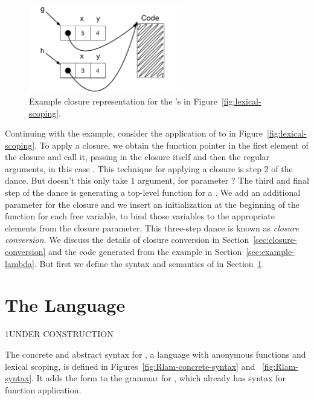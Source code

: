 \documentclass[7x10]{TimesAPriori_MIT}%
\def\pythonEd{1}
\def\edition{1}
\newcommand{\python}[1]{{\if\edition\pythonEd #1\fi}}
\begin{document}
\begin{figure}[tbp]
\centering \includegraphics[width=0.6\textwidth]{figs/closures}
\caption{Example closure representation for the 's
  in Figure~\ref{fig:lexical-scoping}.}
\label{fig:closures}
\end{figure}

Continuing with the example, consider the application of  to
 in Figure~\ref{fig:lexical-scoping}.  To apply a closure, we
obtain the function pointer in the first element of the closure and
call it, passing in the closure itself and then the regular arguments,
in this case . This technique for applying a closure is step
2 of the dance.
%
But doesn't this  only take 1 argument, for parameter
? The third and final step of the dance is generating a
top-level function for a .  We add an additional
parameter for the closure and we insert an initialization at the beginning
of the function for each free variable, to bind those variables to the
appropriate elements from the closure parameter.
%
This three-step dance is known as \emph{closure conversion}.  We
discuss the details of closure conversion in
Section~\ref{sec:closure-conversion} and the code generated from the
example in Section~\ref{sec:example-lambda}. But first we define the
syntax and semantics of \LangLam{} in Section~\ref{sec:r5}.

\section{The \LangLam{} Language}
\label{sec:r5}

\python{UNDER CONSTRUCTION}

The concrete and abstract syntax for \LangLam{}, a language with anonymous
functions and lexical scoping, is defined in
Figures~\ref{fig:Rlam-concrete-syntax} and ~\ref{fig:Rlam-syntax}. It adds
the  form to the grammar for \LangFun{}, which already has
syntax for function application.

\newcommand{\LlambdaGrammarRacket}{
  \begin{array}{lcl}
  \Exp &::=& \LP \key{procedure-arity}~\Exp\RP \\
    &\MID& \CLAMBDA{\LP\LS\Var \key{:} \Type\RS\ldots\RP}{\Type}{\Exp} 
  \end{array}
}
\newcommand{\LlambdaASTRacket}{
  \begin{array}{lcl}
  \itm{op} &::=& \code{procedure-arity} \\
  \Exp &::=& \LAMBDA{\LP\LS\Var\code{:}\Type\RS\ldots\RP}{\Type}{\Exp}
  \end{array}
}
\end{document}

